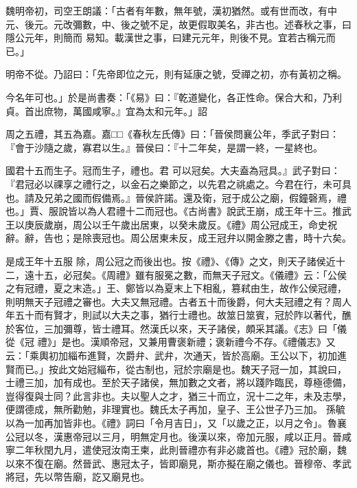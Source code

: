 \begin{pinyinscope}
 魏明帝初，司空王朗議：「古者有年數，無年號，漢初猶然。或有世而改，有中元、後元。元改彌數，中、後之號不足，故更假取美名，非古也。述春秋之事，曰隱公元年，則簡而
 易知。載漢世之事，曰建元元年，則後不見。宜若古稱元而已。」



 明帝不從。乃詔曰：「先帝即位之元，則有延康之號，受禪之初，亦有黃初之稱。


今名年可也。」於是尚書奏：「《易》曰：『乾道變化，各正性命。保合大和，乃利貞。首出庶物，萬國咸寧。』宜為太和元年。」詔



 周之五禮，其五為嘉。嘉□□《春秋左氏傳》曰：「晉侯問襄公年，季武子對曰：『會于沙隨之歲，寡君以生。』晉侯曰：『十二年矣，是謂一終，一星終也。



 國君十五而生子。冠而生子，禮也。君
 可以冠矣。大夫盍為冠具。』武子對曰：『君冠必以祼享之禮行之，以金石之樂節之，以先君之祧處之。今君在行，未可具也。請及兄弟之國而假備焉。』晉侯許諾。還及衛，冠于成公之廟，假鐘磬焉，禮也。」賈、服說皆以為人君禮十二而冠也。《古尚書》說武王崩，成王年十三。推武王以庚辰歲崩，周公以壬午歲出居東，以癸未歲反。《禮》周公冠成王，命史祝辭。辭，告也；是除喪冠也。周公居東未反，成王冠弁以開金滕之書，時十六矣。



 是成王年十五服
 除，周公冠之而後出也。按《禮》、《傳》之文，則天子諸侯近十二，遠十五，必冠矣。《周禮》雖有服冕之數，而無天子冠文。《儀禮》云：「公侯之有冠禮，夏之末造。」王、鄭皆以為夏末上下相亂，篡弒由生，故作公侯冠禮，則明無天子冠禮之審也。大夫又無冠禮。古者五十而後爵，何大夫冠禮之有？周人年五十而有賢才，則試以大夫之事，猶行士禮也。故筮日筮賓，冠於阼以著代，醮於客位，三加彌尊，皆士禮耳。然漢氏以來，天子諸侯，頗采其議。《志》曰「儀從《冠
 禮》」是也。漢順帝冠，又兼用曹褒新禮；褒新禮今不存。《禮儀志》又云：「乘輿初加緇布進賢，次爵弁、武弁，次通天，皆於高廟。王公以下，初加進賢而已。」按此文始冠緇布，從古制也，冠於宗廟是也。魏天子冠一加，其說曰，士禮三加，加有成也。至於天子諸侯，無加數之文者，將以踐阼臨民，尊極德備，豈得復與士同？此言非也。夫以聖人之才，猶三十而立，況十二之年，未及志學，便謂德成，無所勸勉，非理實也。魏氏太子再加，皇子、王公世子乃三加。
 孫毓以為一加再加皆非也。《禮》詞曰「令月吉日」，又「以歲之正，以月之令」。魯襄公冠以冬，漢惠帝冠以三月，明無定月也。後漢以來，帝加元服，咸以正月。晉咸寧二年秋閏九月，遣使冠汝南王柬，此則晉禮亦有非必歲首也。《禮》冠於廟，魏以來不復在廟。然晉武、惠冠太子，皆即廟見，斯亦擬在廟之儀也。晉穆帝、孝武將冠，先以幣告廟，訖又廟見也。




\end{pinyinscope}
